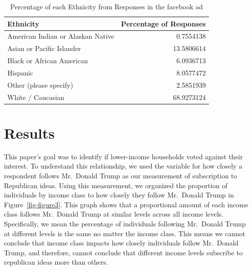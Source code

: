\documentclass[
  letterpaper,
  DIV=11,
  numbers=noendperiod]{scrartcl}
\begin{document}
\begin{longtable}[]{@{}lr@{}}

\caption{\label{tbl-race\_dist}Percentage of each Ethnicity from
Responses in the facebook ad}

\tabularnewline

\toprule\noalign{}
Ethnicity & Percentage of Responses \\
\midrule\noalign{}
\endhead
\bottomrule\noalign{}
\endlastfoot
American Indian or Alaskan Native & 0.7554138 \\
Asian or Pacific Islander & 13.5806614 \\
Black or African American & 6.0936713 \\
Hispanic & 8.0577472 \\
Other (please specify) & 2.5851939 \\
White / Caucasian & 68.9273124 \\

\end{longtable}

\section{Results}\label{sec-results}

This paper's goal was to identify if lower-income households voted
against their interest. To understand this relationship, we used the
variable for how closely a respondent follows Mr.~Donald Trump as our
measurement of subscription to Republican ideas. Using this measurement,
we organized the proportion of individuals by income class to how
closely they follow Mr.~Donald Trump in Figure~\ref{fig-figure3}. This
graph shows that a proportional amount of each income class follows
Mr.~Donald Trump at similar levels across all income levels.
Specifically, we mean the percentage of individuals following Mr.~Donald
Trump at different levels is the same no matter the income class. This
means we cannot conclude that income class impacts how closely
individuals follow Mr.~Donald Trump, and therefore, cannot conclude that
different income levels subscribe to republican ideas more than others.
\end{document}
